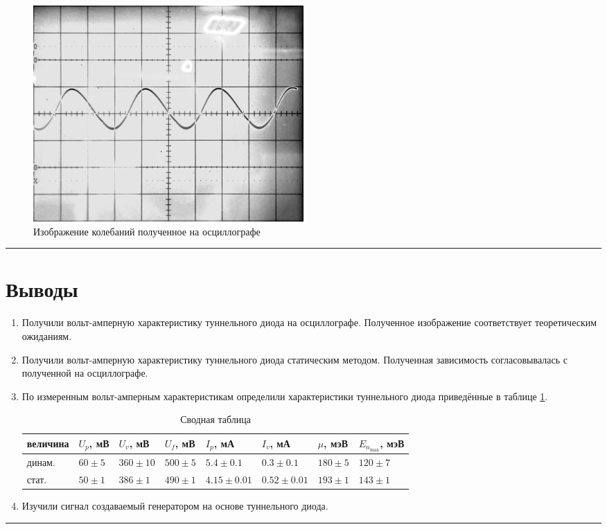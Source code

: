 \documentclass[a4paper,12pt]{article} %
\begin{document}
\begin{figure}[h]
\centering
\includegraphics[width=0.5\textwidth]{generation.png}
\caption{Изображение колебаний полученное на осциллографе}
\label{fig:generation}
\end{figure}

\medskip\hrule\medskip

\section{Выводы}

\begin{enumerate}
\item Получили вольт-амперную характеристику туннельного диода на осциллографе. Полученное изображение соответствует теоретическим ожиданиям.
\item Получили вольт-амперную характеристику туннельного диода статическим методом. Полученная зависимость согласовывалась с полученной на осциллографе.
\item По измеренным вольт-амперным характеристикам определили характеристики туннельного диода приведённые в таблице \ref{tab:results}.

\begin{table}[h]
\centering
\small
\begin{tabular}{|l|l|l|l|l|l|l|l|}
\hline
величина & $U_p$, мВ  & $U_v$, мВ    & $U_f$, мВ   & $I_p$, мА       & $I_v$, мА       & $\mu$, мэВ  & $E_{n_{\max}}$, мэВ \\ \hline
динам.   & $60 \pm 5$ & $360 \pm 10$ & $500 \pm 5$ & $5.4 \pm 0.1$   & $0.3 \pm 0.1$   & $180 \pm 5$ & $120 \pm 7$         \\ \hline
стат.    & $50 \pm 1$ & $386 \pm 1$  & $490 \pm 1$ & $4.15 \pm 0.01$ & $0.52 \pm 0.01$ & $193 \pm 1$ & $143 \pm 1$         \\ \hline
\end{tabular}
\caption{Сводная таблица}
\label{tab:results}
\end{table}

\item Изучили сигнал создаваемый генератором на основе туннельного диода.
\end{enumerate}



\medskip\hrule\medskip
\end{document}
